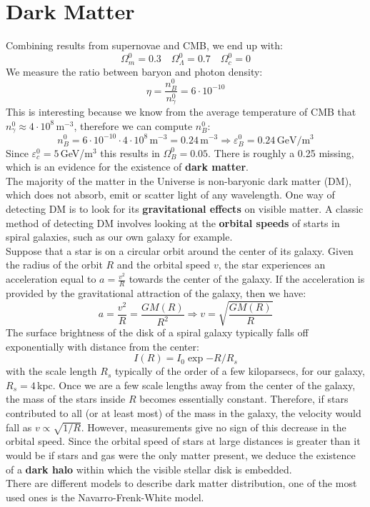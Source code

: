 \documentclass[10.75pt,a4paper,openright,bottom=2cm]{article}
\begin{document}
\section{Dark Matter}
Combining results from supernovae and CMB, we end up with:
\[
\Omega_m^0=0.3 \quad \Omega_\Lambda^0=0.7 \quad \Omega_c^0=0
\]
We measure the ratio between baryon and photon density:
\[\eta=\frac{n_B^0}{n_\gamma^0}=6\cdot10^{-10}
\]
This is interesting because we know from the average temperature of CMB that $n_\gamma^0\approx4\cdot10^8$\,m$^{-3}$, therefore we can compute $n_B^0$:
\[
n_B^0=6\cdot10^{-10}\cdot4\cdot10^8\,\text{m$^{-3}$}=0.24\,\text{m$^{-3}$}\Rightarrow\varepsilon_B^0=0.24\,\text{GeV/m$^3$}
\]
Since $\varepsilon_c^0=5$\,GeV/m$^3$ this results in $\Omega_B^0=0.05$. There is roughly a 0.25 missing, which is an evidence for the existence of \textbf{dark matter}.\\
The majority of the matter in the Universe is non-baryonic dark matter (DM), which does not absorb, emit or scatter light of any wavelength. One way of detecting DM is to look for its \textbf{gravitational effects} on visible matter. A classic method of detecting DM involves looking at the \textbf{orbital speeds} of starts in spiral galaxies, such as our own galaxy for example.\\
Suppose that a star is on a circular orbit around the center of its galaxy. Given the radius of the orbit $R$ and the orbital speed $v$, the star experiences an acceleration equal to $a=\frac{v^2}{R}$ towards the center of the galaxy. If the acceleration is provided by the gravitational attraction of the galaxy, then we have:
\[
a=\frac{v^2}{R}=\frac{GM(R)}{R^2}\Rightarrow v=\sqrt{\frac{GM(R)}{R}}
\]
The surface brightness of the disk of a spiral galaxy typically falls off exponentially with distance from the center:
\[
I(R)=I_0\exp{-R/R_s}
\]
with the scale length $R_s$ typically of the order of a few kiloparsecs, for our galaxy, $R_s=4$\,kpc. Once we are a few scale lengths away from the center of the galaxy, the mass of the stars inside $R$ becomes essentially constant. Therefore, if stars contributed to all (or at least most) of the mass in the galaxy, the velocity would fall as $v\propto\sqrt{1/R}$. However, measurements give no sign of this decrease in the orbital speed. Since the orbital speed of stars at large distances is greater than it would be if stars and gas were the only matter present, we deduce the existence of a \textbf{dark halo} within which the visible stellar disk is embedded.\\
There are different models to describe dark matter distribution, one of the most used ones is the Navarro-Frenk-White model.
\end{document}
